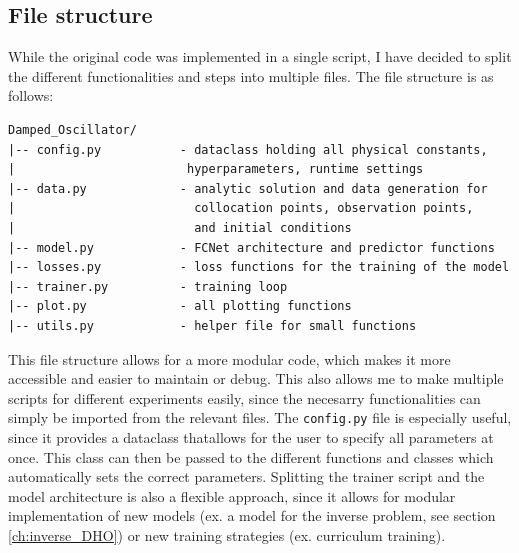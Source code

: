 \documentclass[we,twoside,openright,a4paper,11pt]{uantwerpenbamathesis}
\begin{document}
\subsection{File structure}
While the original code was implemented in a single script, I have decided to split the different functionalities and steps into multiple files. The file structure is as follows:
\begin{tcolorbox}[title=Damped harmonic oscillator file structure, colback=black!10!white, colframe=black!40!white, sharp corners]
\begin{verbatim}
Damped_Oscillator/
|-- config.py           - dataclass holding all physical constants,
|                        hyperparameters, runtime settings
|-- data.py             - analytic solution and data generation for
|                         collocation points, observation points,
|                         and initial conditions
|-- model.py            - FCNet architecture and predictor functions
|-- losses.py           - loss functions for the training of the model
|-- trainer.py          - training loop
|-- plot.py             - all plotting functions
|-- utils.py            - helper file for small functions
\end{verbatim}
\end{tcolorbox}
This file structure allows for a more modular code, which makes it more accessible and easier to maintain or debug. This also allows me to make multiple scripts for different experiments easily, since the necesarry functionalities can simply be imported from the relevant files. The \verb|config.py| file is especially useful, since it provides a dataclass thatallows for the user to specify all parameters at once. This class can then be passed to the different functions and classes which automatically sets the correct parameters. Splitting the trainer script and the model architecture is also a flexible approach, since it allows for modular implementation of new models (ex. a model for the inverse problem, see section \ref{ch:inverse_DHO}) or new training strategies (ex. curriculum training).\\
\end{document}
